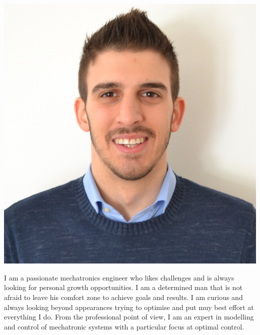 \documentclass[9pt]{developercv} %
\begin{document}
\begin{minipage}[t]{0.2\textwidth} %
	\vspace{-\baselineskip} %
		\hfill
	\includegraphics[width=1.0\linewidth]{Fototessera.jpg}
\end{minipage}
%
%
%
\begin{minipage}[t]{0.5\textwidth} %
	\vspace{-\baselineskip} %
%
I am a passionate mechatronics engineer who likes challenges and is always looking for personal growth opportunities. I am a determined man that is not afraid to leave his comfort zone to achieve goals and results. I am curious and always looking beyond appearances trying to optimise and put muy best effort at everything I do.
From the professional point of view, I am an expert in modelling and control of mechatronic systems with a particular focus at optimal control.
%
\end{minipage}
\hfill %
\begin{minipage}[t]{0.45\textwidth} %
	\vspace{-\baselineskip} %
	\begin{barchart}{5.5}
	\end{barchart}
\end{minipage}
%
%
%
\end{document}
